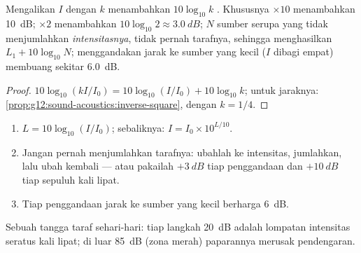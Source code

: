 \begin{proposition}\label{prop:g12:sound-acoustics:db-arithmetic}
Mengalikan $I$ dengan $k$ menambahkan $10\log_{10}k$ . Khususnya
$\times 10$ menambahkan \qty{10}{dB}; $\times 2$ menambahkan
$10\log_{10}2 \approx \qty{3.0}{dB}$; $N$ sumber serupa yang tidak
 menjumlahkan \emph{intensitasnya}, tidak pernah tarafnya,
sehingga menghasilkan $L_1 + 10\log_{10}N$; menggandakan jarak ke sumber
yang kecil ($I$ dibagi empat) membuang sekitar \qty{6.0}{dB}.
\end{proposition}

\begin{proof}
$10\log_{10}(kI/I_0) = 10\log_{10}(I/I_0) + 10\log_{10}k$; untuk
jaraknya: \cref{prop:g12:sound-acoustics:inverse-square}, dengan
$k = 1/4$.
\end{proof}

\begin{method}\label{met:g12:sound-acoustics:db}
\begin{enumerate}
  \item $L = 10\log_{10}(I/I_0)$; sebaliknya:
        $I = I_0 \times 10^{L/10}$.
  \item Jangan pernah menjumlahkan tarafnya: ubahlah ke intensitas,
        jumlahkan, lalu ubah kembali --- atau pakailah
        $+\qty{3}{dB}$ tiap penggandaan dan $+\qty{10}{dB}$ tiap
        sepuluh kali lipat.
  \item Tiap penggandaan jarak ke sumber yang kecil berharga
        \qty{6}{dB}.
\end{enumerate}
\end{method}

\begin{omfigure}

{\small Sebuah tangga taraf sehari-hari: tiap langkah \qty{20}{dB}
adalah lompatan intensitas seratus kali lipat; di luar \qty{85}{dB}
(zona merah) paparannya merusak pendengaran.}
\end{omfigure}

